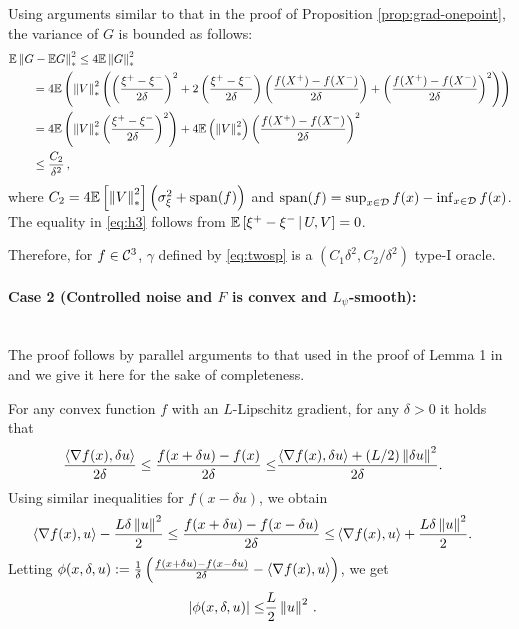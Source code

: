 Using arguments similar to that in the proof of Proposition \ref{prop:grad-onepoint}, the variance of $G$ is bounded as follows:
\begin{align}
\MoveEqLeft \E\left\| G - \E G\right\|_*^2
 \le 4 \E \left\|G\right\|_*^2 \nonumber \\
& =  4\E\left( \left\| V \right\|_*^2 \left(\left(\dfrac{\xi^+ - \xi^-}{2\delta}\right)^2  + 2 \left(\dfrac{\xi^+ - \xi^-}{2\delta}\right) \left(\dfrac{f(X^+) - f(X^-)}{2\delta}\right)
+ \left( \dfrac{f(X^+) - f(X^-)}{2\delta} \right)^2 \right)\right) \nonumber \\
&=  4\E\left( \left\| V \right\|_*^2 \left(\dfrac{\xi^+ - \xi^-}{2\delta}\right)^2\right)
+ 4 \E \left(\left\| V \right\|_*^2 \right)\left( \dfrac{f(X^+) - f(X^-)}{2\delta} \right)^2  \label{eq:h3} \\
& \le  \frac{C_2}{\delta^2}\,, \nonumber \label{eq:h4}
\end{align}
where $C_2 = 4 \mathbb{E}\left[\left\|V\right\|_*^2\right]\left( \sigma_\xi^2+\operatorname{span}(f)\right)$
and $\operatorname{span}(f) = \sup_{x\in \mathcal{D}} f(x) - \inf_{x\in \mathcal{D}} f(x)$.
The equality in \eqref{eq:h3} follows from $\mathbb{E}\left[ \xi^+-\xi^- \,|\, U,V \right] = 0$.

Therefore, for $f \in \mathcal{C}^3$, $\gamma$ defined by \eqref{eq:twosp} is a $(C_1\delta^2, C_2/\delta^2)$ type-I oracle.

\paragraph{Case 2 (Controlled noise and $F$ is convex and $L_{\psi}$-smooth):}\ \\
The proof follows by parallel arguments to that used in the proof of Lemma 1 in \cite{duchi2015optimal} and we give it here for the sake of completeness.

For any convex function $f$ with an $L$-Lipschitz gradient, for any $\delta>0$ it holds that
\begin{align*}
\frac{\left\langle\nabla f(x), \delta u\right\rangle}{2\delta} \le \frac{f(x + \delta u) -  f(x)}{2\delta} \le& \frac{\left\langle\nabla f(x), \delta u\right\rangle + (L / 2) \left\|\delta u\right\|^2}{2\delta}.
\end{align*}
Using similar inequalities for $f(x-\delta u)$, we obtain
\begin{align*}
\left\langle\nabla f(x), u\right\rangle - \frac{L \delta \left\| u\right\|^2}{2} \le \frac{f(x + \delta u) -  f(x-\delta u)}{2\delta} \le& \left\langle\nabla f(x), u\right\rangle + \frac{L \delta \left\| u\right\|^2}{2}.
\end{align*}
Letting
$\phi(x,\delta,u):=\frac1{\delta}\left(\frac{f(x + \delta u) -  f(x-\delta u)}{2\delta} - \left\langle\nabla f(x),  u\right\rangle\right)$, we get
\begin{align*}
\left|\phi(x,\delta,u) \right| \le&  \dfrac{L}{2} \left\|u\right\|^2\,.
\end{align*}


